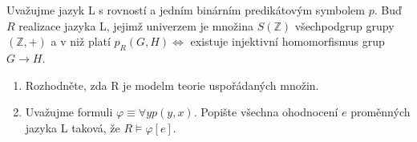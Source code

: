 Uvažujme jazyk L s rovností a jedním binárním predikátovým symbolem $p$. Buď $R$
realizace jazyka L, jejimž univerzem je množina $S(\mathbb{Z})$ všechpodgrup
grupy $(\mathbb{Z}, +)$ a v niž platí $p_{R}(G,H) \Leftrightarrow$ existuje
injektivní homomorfismus grup $G\rightarrow H$.
\begin{enumerate}[1.]
  \item Rozhodněte, zda R je modelm teorie uspořádaných množin.
  \item Uvažujme formuli $\varphi \equiv \forall y p(y,x)$. Popište všechna
  ohodnocení $e$ proměnných jazyka L taková, že $R \models \varphi [e]$.
\end{enumerate}
